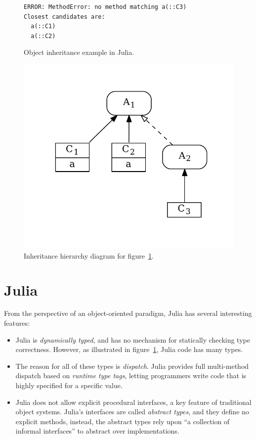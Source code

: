 \documentclass[preprint]{sigplanconf}
\begin{document}
\begin{figure}[h]


\begin{Verbatim}[fontsize=\small]
ERROR: MethodError: no method matching a(::C3)
Closest candidates are:
  a(::C1)
  a(::C2)
\end{Verbatim}
\caption{Object inheritance example in Julia.}
\label{code:broken}
\end{figure}


\begin{figure}
\centering
\includegraphics[scale=.6]{example2.pdf}
\caption{Inheritance hierarchy diagram for figure~\ref{code:broken}.}
\label{fig:algo}
\end{figure}

\section{Julia}

From the perspective of an object-oriented paradigm, Julia has several interesting features:
\begin{itemize}
\item Julia is \emph{dynamically typed}, and has no mechanism for statically
checking type correctness. However, as illustrated in figure~\ref{code:broken},
Julia code has many types.
\item The reason for all of these types is \emph{dispatch}. Julia provides 
full multi-method dispatch based on \emph{runtime type tags}, letting programmers
write code that is highly specified for a specific value.
\item Julia does not allow explicit procedural interfaces, a key feature of traditional 
object systems. Julia's interfaces are called \emph{abstract types}, and they 
define no explicit methods, instead, the abstract types rely upon ``a collection of informal interfaces''
\cite{juliadocu} to abstract over implementations.
\end{itemize}
\end{document}
